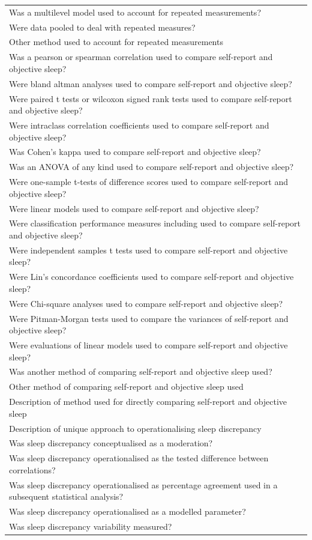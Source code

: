 \documentclass[
]{article}
\begin{document}
\begin{longtable}[t]{l}
Was a multilevel model used to account for repeated measurements?\\
\addlinespace
Were data pooled to deal with repeated measures?\\
Other method used to account for repeated measurements\\
Was a pearson or spearman correlation used to compare self-report and objective sleep?\\
Were bland altman analyses used to compare self-report and objective sleep?\\
Were paired t tests or wilcoxon signed rank tests used to compare self-report and objective sleep?\\
\addlinespace
Were intraclass correlation coefficients used to compare self-report and objective sleep?\\
Was Cohen's kappa used to compare self-report and objective sleep?\\
Was an ANOVA of any kind used to compare self-report and objective sleep?\\
Were one-sample t-tests of difference scores used to compare self-report and objective sleep?\\
Were linear models used to compare self-report and objective sleep?\\
\addlinespace
Were classification performance measures including used to compare self-report and objective sleep?\\
Were independent samples t tests used to compare self-report and objective sleep?\\
Were Lin's concordance coefficients used to compare self-report and objective sleep?\\
Were Chi-square analyses used to compare self-report and objective sleep?\\
Were Pitman-Morgan tests used to compare the variances of self-report and objective sleep?\\
\addlinespace
Were evaluations of linear models  used to compare self-report and objective sleep?\\
Was another method of comparing self-report and objective sleep used?\\
Other method of comparing self-report and objective sleep used\\
Description of method used for directly comparing self-report and objective sleep\\
Description of unique approach to operationalising sleep discrepancy\\
\addlinespace
Was sleep discrepancy conceptualised as a moderation?\\
Was sleep discrepancy operationalised as the tested difference between correlations?\\
Was sleep discrepancy operationalised as percentage agreement used in a subsequent statistical analysis?\\
Was sleep discrepancy operationalised as a modelled parameter?\\
Was sleep discrepancy variability measured?\\*
\end{longtable}
\endgroup{}
\end{document}
